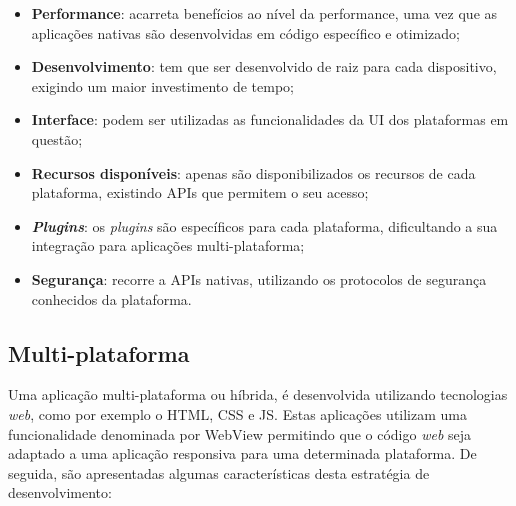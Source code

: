 \begin{itemize}
	\item \textbf{Performance}: acarreta benefícios ao nível da performance, uma vez que as aplicações nativas são desenvolvidas em código específico e otimizado; 

	
	
	\item \textbf{Desenvolvimento}: tem que ser desenvolvido de raiz para cada dispositivo, exigindo um maior investimento de tempo;
	
	\item \textbf{Interface}: podem ser utilizadas as funcionalidades da \ac{UI} dos plataformas em questão;
	
	
	\item \textbf{Recursos disponíveis}: apenas são disponibilizados os recursos de cada plataforma, existindo APIs que permitem o seu acesso;
	
	

	\item \textbf{\textit{Plugins}}: os \textit{plugins} são específicos para cada plataforma, dificultando a sua integração para aplicações multi-plataforma; 
	
	
	\item \textbf{Segurança}: recorre a APIs nativas, utilizando os protocolos de segurança conhecidos da plataforma.
	
	
\end{itemize}


\subsection{Multi-plataforma}



Uma aplicação multi-plataforma ou híbrida, é desenvolvida utilizando tecnologias \textit{web}, como por exemplo o \ac{HTML}, \ac{CSS} e \ac{JS}. Estas aplicações utilizam uma funcionalidade denominada por WebView permitindo que o código \textit{web} seja adaptado a uma aplicação responsiva para uma determinada plataforma. De seguida, são apresentadas algumas características desta estratégia de desenvolvimento\cite{Ibm2012a}: 







